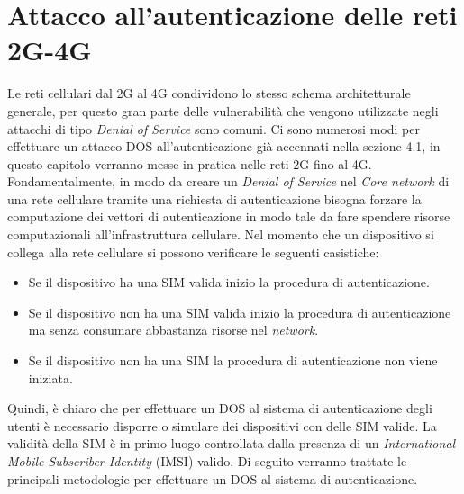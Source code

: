 \chapter{Attacco all'autenticazione delle reti 2G-4G}
Le reti cellulari dal 2G al 4G condividono lo stesso schema architetturale generale, per questo gran parte delle vulnerabilità che vengono
utilizzate negli attacchi di tipo \textit{Denial of Service} sono comuni.
Ci sono numerosi modi per effettuare un attacco DOS all'autenticazione già accennati nella sezione 4.1, in questo capitolo verranno messe in pratica 
nelle reti 2G fino al 4G.\\
Fondamentalmente, in modo da creare un \textit{Denial of Service} nel \textit{Core network} di una rete cellulare tramite una richiesta di autenticazione bisogna forzare
la computazione dei vettori di autenticazione in modo tale da fare spendere risorse computazionali all'infrastruttura cellulare.
Nel momento che un dispositivo si collega alla rete cellulare si possono verificare le seguenti casistiche:
\begin{itemize}
    \item Se il dispositivo ha una SIM valida inizio la procedura di autenticazione.
    \item Se il dispositivo non ha una SIM valida inizio la procedura di autenticazione ma senza consumare abbastanza risorse nel \textit{network}.
    \item Se il dispositivo non ha una SIM la procedura di autenticazione non viene iniziata.
\end{itemize}
Quindi, è chiaro che per effettuare un DOS al sistema di autenticazione degli utenti è necessario disporre o simulare dei dispositivi con delle SIM valide. La validità della SIM è 
in primo luogo controllata dalla presenza di un \textit{International Mobile Subscriber Identity } (IMSI) valido.
Di seguito verranno trattate le principali metodologie per effettuare un DOS al sistema di autenticazione.


